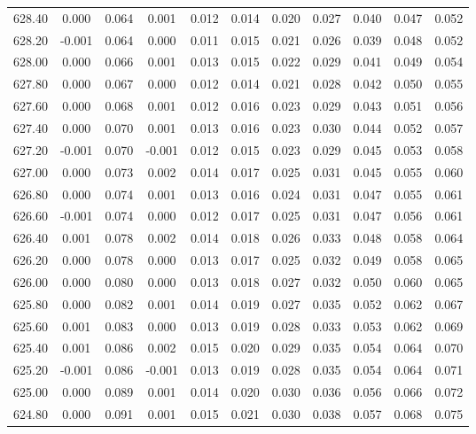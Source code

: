 \begin{longtable}{cccccccccc}
    628.40 &  0.000 &  0.064 &  0.001 &  0.012 &  0.014 &  0.020 &  0.027 &  0.040 &  0.047 &  0.052 \\
    628.20 & -0.001 &  0.064 &  0.000 &  0.011 &  0.015 &  0.021 &  0.026 &  0.039 &  0.048 &  0.052 \\
    628.00 &  0.000 &  0.066 &  0.001 &  0.013 &  0.015 &  0.022 &  0.029 &  0.041 &  0.049 &  0.054 \\
    627.80 &  0.000 &  0.067 &  0.000 &  0.012 &  0.014 &  0.021 &  0.028 &  0.042 &  0.050 &  0.055 \\
    627.60 &  0.000 &  0.068 &  0.001 &  0.012 &  0.016 &  0.023 &  0.029 &  0.043 &  0.051 &  0.056 \\
    627.40 &  0.000 &  0.070 &  0.001 &  0.013 &  0.016 &  0.023 &  0.030 &  0.044 &  0.052 &  0.057 \\
    627.20 & -0.001 &  0.070 & -0.001 &  0.012 &  0.015 &  0.023 &  0.029 &  0.045 &  0.053 &  0.058 \\
    627.00 &  0.000 &  0.073 &  0.002 &  0.014 &  0.017 &  0.025 &  0.031 &  0.045 &  0.055 &  0.060 \\
    626.80 &  0.000 &  0.074 &  0.001 &  0.013 &  0.016 &  0.024 &  0.031 &  0.047 &  0.055 &  0.061 \\
    626.60 & -0.001 &  0.074 &  0.000 &  0.012 &  0.017 &  0.025 &  0.031 &  0.047 &  0.056 &  0.061 \\
    626.40 &  0.001 &  0.078 &  0.002 &  0.014 &  0.018 &  0.026 &  0.033 &  0.048 &  0.058 &  0.064 \\
    626.20 &  0.000 &  0.078 &  0.000 &  0.013 &  0.017 &  0.025 &  0.032 &  0.049 &  0.058 &  0.065 \\
    626.00 &  0.000 &  0.080 &  0.000 &  0.013 &  0.018 &  0.027 &  0.032 &  0.050 &  0.060 &  0.065 \\
    625.80 &  0.000 &  0.082 &  0.001 &  0.014 &  0.019 &  0.027 &  0.035 &  0.052 &  0.062 &  0.067 \\
    625.60 &  0.001 &  0.083 &  0.000 &  0.013 &  0.019 &  0.028 &  0.033 &  0.053 &  0.062 &  0.069 \\
    625.40 &  0.001 &  0.086 &  0.002 &  0.015 &  0.020 &  0.029 &  0.035 &  0.054 &  0.064 &  0.070 \\
    625.20 & -0.001 &  0.086 & -0.001 &  0.013 &  0.019 &  0.028 &  0.035 &  0.054 &  0.064 &  0.071 \\
    625.00 &  0.000 &  0.089 &  0.001 &  0.014 &  0.020 &  0.030 &  0.036 &  0.056 &  0.066 &  0.072 \\
    624.80 &  0.000 &  0.091 &  0.001 &  0.015 &  0.021 &  0.030 &  0.038 &  0.057 &  0.068 &  0.075 \\

\end{longtable}
